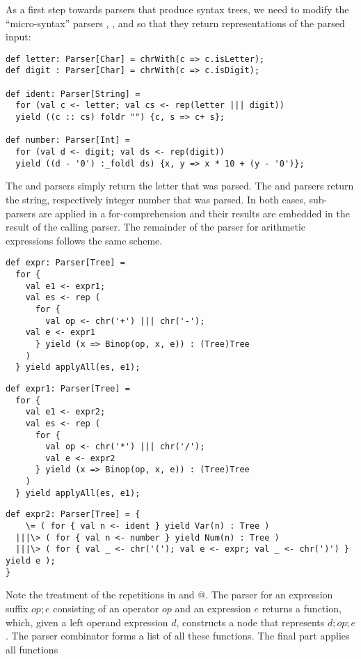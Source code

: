 \documentclass[11pt]{report}
\begin{document}
As a first step towards parsers that produce syntax trees, we need to
modify the ``micro-syntax'' parsers \verb@letter@, \verb@digit@,
\verb@ident@ and \verb@number@ so that they return representations of
the parsed input:
\begin{verbatim}
def letter: Parser[Char] = chrWith(c => c.isLetter);
def digit : Parser[Char] = chrWith(c => c.isDigit);

def ident: Parser[String] =
  for (val c <- letter; val cs <- rep(letter ||| digit))
  yield ((c :: cs) foldr "") {c, s => c+ s};

def number: Parser[Int] =
  for (val d <- digit; val ds <- rep(digit))
  yield ((d - '0') :_foldl ds) {x, y => x * 10 + (y - '0')};
\end{verbatim}
The \verb@letter@ and \verb@digit@ parsers simply return the letter
that was parsed. The \verb@ident@ and \verb@number@ parsers return the
string, respectively integer number that was parsed.  In both cases,
sub-parsers are applied in a for-comprehension and their results are
embedded in the result of the calling parser.  The remainder of the
parser for arithmetic expressions follows the same scheme.
\begin{verbatim}
def expr: Parser[Tree] =
  for {
    val e1 <- expr1;
    val es <- rep (
      for {
        val op <- chr('+') ||| chr('-');
	val e <- expr1
      } yield (x => Binop(op, x, e)) : (Tree)Tree
    )
  } yield applyAll(es, e1);
\end{verbatim}
\begin{verbatim}
def expr1: Parser[Tree] =
  for {
    val e1 <- expr2;
    val es <- rep (
      for {
        val op <- chr('*') ||| chr('/');
        val e <- expr2
      } yield (x => Binop(op, x, e)) : (Tree)Tree
    )
  } yield applyAll(es, e1);
\end{verbatim}
\begin{verbatim}
def expr2: Parser[Tree] = {
    \= ( for { val n <- ident } yield Var(n) : Tree )
  |||\> ( for { val n <- number } yield Num(n) : Tree )
  |||\> ( for { val _ <- chr('('); val e <- expr; val _ <- chr(')') } yield e );
}
\end{verbatim}
Note the treatment of the repetitions in \verb@expr@ and
@. The parser for an expression suffix $op;e$ consisting of an
operator $op$ and an expression $e$ returns a function, which, given a
left operand expression $d$, constructs a \verb@Binop@ node that
represents $d;op;e$. The \verb@rep@ parser combinator forms a list of
all these functions. The final \verb@yield@ part applies all functions
\end{document}

